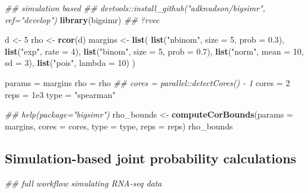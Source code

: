 \documentclass[
]{article}
\newenvironment{Shaded}{\begin{snugshade}}{\end{snugshade}}
\newcommand{\CommentTok}[1]{\textcolor[rgb]{0.56,0.35,0.01}{\textit{#1}}}
\newcommand{\DataTypeTok}[1]{\textcolor[rgb]{0.13,0.29,0.53}{#1}}
\newcommand{\DecValTok}[1]{\textcolor[rgb]{0.00,0.00,0.81}{#1}}
\newcommand{\FloatTok}[1]{\textcolor[rgb]{0.00,0.00,0.81}{#1}}
\newcommand{\KeywordTok}[1]{\textcolor[rgb]{0.13,0.29,0.53}{\textbf{#1}}}
\newcommand{\NormalTok}[1]{#1}
\newcommand{\StringTok}[1]{\textcolor[rgb]{0.31,0.60,0.02}{#1}}
\begin{document}
\begin{Shaded}
\begin{Highlighting}[]

\CommentTok{## simulation based}
\CommentTok{## devtools::install_github("adknudson/bigsimr", ref="develop")}
\KeywordTok{library}\NormalTok{(bigsimr)}
\CommentTok{## ?rvec}

\NormalTok{d <-}\StringTok{ }\DecValTok{5}
\NormalTok{rho <-}\StringTok{ }\KeywordTok{rcor}\NormalTok{(d)}
\NormalTok{margins <-}\StringTok{ }\KeywordTok{list}\NormalTok{(}
    \KeywordTok{list}\NormalTok{(}\StringTok{"nbinom"}\NormalTok{, }\DataTypeTok{size =} \DecValTok{5}\NormalTok{, }\DataTypeTok{prob =} \FloatTok{0.3}\NormalTok{),}
    \KeywordTok{list}\NormalTok{(}\StringTok{"exp"}\NormalTok{, }\DataTypeTok{rate =} \DecValTok{4}\NormalTok{),}
    \KeywordTok{list}\NormalTok{(}\StringTok{"binom"}\NormalTok{, }\DataTypeTok{size =} \DecValTok{5}\NormalTok{, }\DataTypeTok{prob =} \FloatTok{0.7}\NormalTok{),}
    \KeywordTok{list}\NormalTok{(}\StringTok{"norm"}\NormalTok{, }\DataTypeTok{mean =} \DecValTok{10}\NormalTok{, }\DataTypeTok{sd =} \DecValTok{3}\NormalTok{),}
    \KeywordTok{list}\NormalTok{(}\StringTok{"pois"}\NormalTok{, }\DataTypeTok{lambda =} \DecValTok{10}\NormalTok{)}
\NormalTok{)}
 
\NormalTok{params =}\StringTok{ }\NormalTok{margins}
\NormalTok{rho =}\StringTok{ }\NormalTok{rho}
\CommentTok{## cores = parallel::detectCores() - 1}
\NormalTok{cores =}\StringTok{ }\DecValTok{2}
\NormalTok{reps =}\StringTok{ }\FloatTok{1e3}
\NormalTok{type =}\StringTok{ "spearman"}

\CommentTok{## help(package="bigsimr")}
\NormalTok{rho_bounds <-}\StringTok{ }\KeywordTok{computeCorBounds}\NormalTok{(}\DataTypeTok{params =}\NormalTok{ margins, }\DataTypeTok{cores =}\NormalTok{ cores, }\DataTypeTok{type =}\NormalTok{ type, }\DataTypeTok{reps =}\NormalTok{ reps)}
\NormalTok{rho_bounds}
\end{Highlighting}
\end{Shaded}

\hypertarget{simulation-based-joint-probability-calculations}{%
\subsection{Simulation-based joint probability calculations}\label{simulation-based-joint-probability-calculations}}

\begin{Shaded}
\begin{Highlighting}[]
\CommentTok{## full workflow simulating RNA-seq data}
\end{Highlighting}
\end{Shaded}
\end{document}
